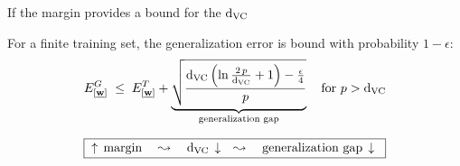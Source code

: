 \begin{frame}

If the margin provides a bound for the $\mathrm{d}_{\mathrm{VC}}$


\pause


For a finite training set, the generalization error is bound with probability $1-\epsilon$:
            \begin{equation}
				E^{G}_{[\underline{\mathbf{w}}]} \;\le\; E^{T}_{[\underline{\mathbf{w}}]} + 
                \underbrace{
                \sqrt{\frac{\mathrm{d}_{\mathrm{VC}} \left(\ln \frac{2\,p}{\mathrm{d}_{\mathrm{VC}}} + 1\right)-\frac{\epsilon}{4}}{p}}}_{\text{generalization gap}} \quad \text{for } p > \mathrm{d}_{\mathrm{VC}}
				\label{eq:generalizationresults}
            \end{equation}
          
\begin{equation}
\boxed{
\;
\uparrow \, \text{margin}
\quad \leadsto \quad
\mathrm{d}_{\mathrm{VC}} \, \downarrow 
\quad \leadsto \quad
\text{generalization gap} \, \downarrow{}
\;   
}
\end{equation}  

\end{frame}

